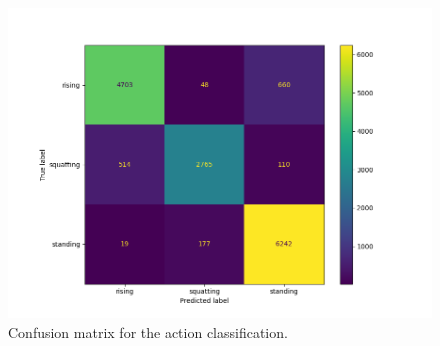 \begin{figure}[t]
   \centering
   \includegraphics[scale=0.4,trim={1cm 0 5.3cm 2cm},clip]{figures/cm01.png}
   \caption{Confusion matrix for the action classification.}
   \label{fig:confusion_matrix}
\end{figure}

